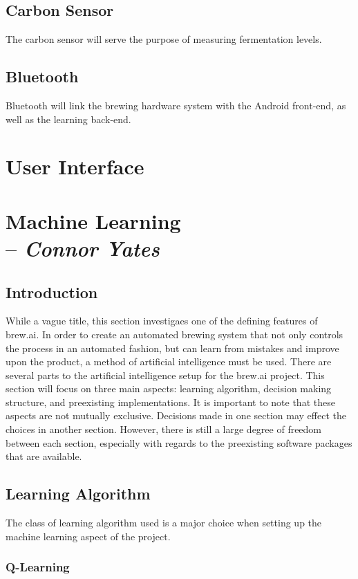 \documentclass[draftclsnofoot,onecolumn,letterpaper,10pt]{IEEEtran}
\begin{document}
\subsection{Carbon Sensor}
The carbon sensor will serve the purpose of measuring fermentation levels.

\subsection{Bluetooth}
Bluetooth will link the brewing hardware system with the Android front-end, as well as the learning back-end.

\section{User Interface}

\section{Machine Learning \\ -- \textbf{\textit{Connor Yates}}}
\subsection{Introduction}
While a vague title, this section investigaes one of the defining features of brew.ai.
In order to create an automated brewing system that not only controls the process in an automated fashion, but can learn from mistakes and improve upon the product, a method of artificial intelligence must be used.
There are several parts to the artificial intelligence setup for the brew.ai project.
This section will focus on three main aspects: learning algorithm, decision making structure, and preexisting implementations.
It is important to note that these aspects are not mutually exclusive. 
Decisions made in one section may effect the choices in another section.
However, there is still a large degree of freedom between each section, especially with regards to the preexisting software packages that are available.

\subsection{Learning Algorithm}
The class of learning algorithm used is a major choice when setting up the machine learning aspect of the project.

\subsubsection{Q-Learning}
\end{document}
